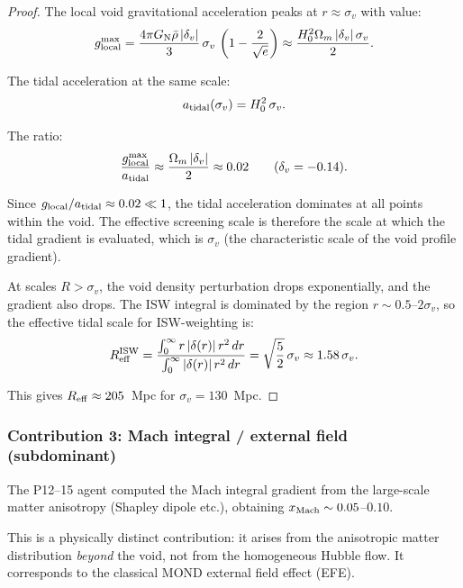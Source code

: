 \documentclass[11pt,a4paper]{article}
\newcommand{\GN}{G_{\rm N}}
\newcommand{\Omm}{\Omega_m}
\begin{document}
\begin{proof}
The local void gravitational acceleration peaks at $r \approx \sigma_v$
with value:
\begin{equation}
g_{\rm local}^{\rm max} = \frac{4\pi\GN\bar{\rho}\,|\delta_v|}{3}\,
\sigma_v\,\left(1 - \frac{2}{\sqrt{e}}\right)
\approx \frac{H_0^2\Omm\,|\delta_v|\,\sigma_v}{2}.
\end{equation}

The tidal acceleration at the same scale:
\begin{equation}
a_{\rm tidal}(\sigma_v) = H_0^2\,\sigma_v.
\end{equation}

The ratio:
\begin{equation}
\frac{g_{\rm local}^{\rm max}}{a_{\rm tidal}}
\approx \frac{\Omm\,|\delta_v|}{2} \approx 0.02
\qquad (\delta_v = -0.14).
\end{equation}

Since $g_{\rm local}/a_{\rm tidal} \approx 0.02 \ll 1$, the tidal
acceleration dominates at all points within the void. The effective
screening scale is therefore the scale at which the tidal gradient
is evaluated, which is $\sigma_v$ (the characteristic scale of the
void profile gradient).

At scales $R > \sigma_v$, the void density perturbation drops
exponentially, and the gradient also drops. The ISW integral is
dominated by the region $r \sim 0.5$--$2\sigma_v$, so the effective
tidal scale for ISW-weighting is:
\begin{equation}
R_{\rm eff}^{\rm ISW} = \frac{\int_0^\infty
  r\,|\delta(r)|\,r^2\,dr}{\int_0^\infty |\delta(r)|\,r^2\,dr}
= \sqrt{\frac{5}{2}}\,\sigma_v \approx 1.58\,\sigma_v.
\end{equation}

This gives $R_{\rm eff} \approx 205$~Mpc for $\sigma_v = 130$~Mpc.
\end{proof}


\subsubsection{Contribution 3: Mach integral / external field (subdominant)}

The P12--15 agent computed the Mach integral gradient from the
large-scale matter anisotropy (Shapley dipole etc.), obtaining
$x_{\rm Mach} \sim 0.05$--$0.10$.

This is a physically distinct contribution: it arises from the
anisotropic matter distribution \emph{beyond} the void, not from the
homogeneous Hubble flow. It corresponds to the classical MOND
external field effect (EFE).
\end{document}
